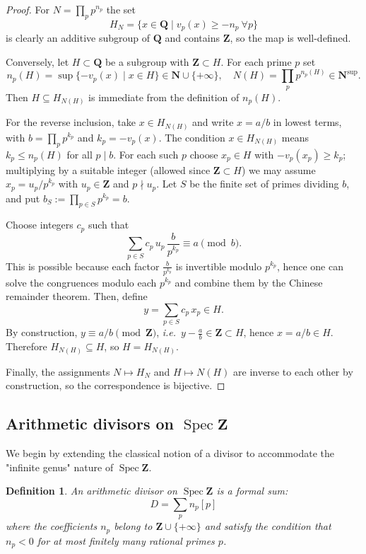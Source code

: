 \documentclass[11pt,a4paper]{article}
\newcommand{\Q}{\mathbf{Q}}
\newcommand{\Z}{\mathbf{Z}}
\newcommand{\N}{\mathbf{N}}
\def\N{{\mathbf N}}
\def\spz{\Spec \Z}
\newcommand{\Spec}{\operatorname{Spec}}
\def\spz{\Spec \Z}
\def\ie{{\it i.e.\/}\ }
\theoremstyle{plain}
\newtheorem{defn}[thm]{Definition}
\theoremstyle{definition} %
\begin{document}
\begin{proof}
For $N=\prod_p p^{n_p}$ the set
\[
H_N=\{x\in\Q\mid v_p(x)\ge -n_p\ \forall p\}
\]
is clearly an additive subgroup of $\Q$ and contains $\Z$, so the map is well-defined.

Conversely, let $H\subset\Q$ be a subgroup with $\Z\subset H$. For each prime $p$ set
\[
n_p(H)=\sup\{-v_p(x)\mid x\in H\}\in \N\cup\{+\infty\},
\quad
N(H)=\prod_p p^{n_p(H)}\in \N^{\sup}.
\]
Then $H\subseteq H_{N(H)}$ is immediate from the definition of $n_p(H)$.

For the reverse inclusion, take $x\in H_{N(H)}$ and write $x=a/b$ in lowest terms, with
$b=\prod_p p^{k_p}$ and $k_p=-v_p(x)$. The condition $x\in H_{N(H)}$ means $k_p\le n_p(H)$ for
all $p\mid b$. For each such $p$ choose $x_p\in H$ with $-v_p(x_p)\ge k_p$; multiplying by a suitable
integer (allowed since $\Z\subset H$) we may assume $x_p=u_p/p^{k_p}$ with $u_p\in\Z$ and $p\nmid u_p$.
Let $S$ be the finite set of primes dividing $b$, and put $b_S:=\prod_{p\in S}p^{k_p}=b$.

Choose integers $c_p$ such that
\[
\sum_{p\in S} c_p\,u_p\,\frac{b}{p^{k_p}}\equiv a \pmod{b}.
\]
This is possible because each factor $\frac{b}{p^{k_p}}$ is invertible modulo $p^{k_p}$, hence one
can solve the congruences modulo each $p^{k_p}$ and combine them by the Chinese remainder theorem.
Then, define
\[
y=\sum_{p\in S} c_p\,x_p \in H.
\]
By construction, $y\equiv a/b \pmod{\Z}$, \ie $y-\frac{a}{b}\in\Z\subset H$, hence $x=a/b\in H$.
Therefore $H_{N(H)}\subseteq H$, so $H=H_{N(H)}$.

Finally, the assignments $N\mapsto H_N$ and $H\mapsto N(H)$ are inverse to each other by construction,
so the correspondence is bijective.
\end{proof}




\subsection{Arithmetic divisors on $\spz$}



We begin by extending the classical notion of a divisor to accommodate the "infinite genus" nature of $\spz$.

\begin{defn}\label{gendiv}
An arithmetic divisor on $\spz$ is a formal sum:
\[
D = \sum_{p} n_p [p]
\]
where the coefficients $n_p$ belong to $\Z \cup \{+\infty\}$ and satisfy the condition that $n_p < 0$ for at most finitely many rational primes $p$.
\end{defn}
\end{document}
